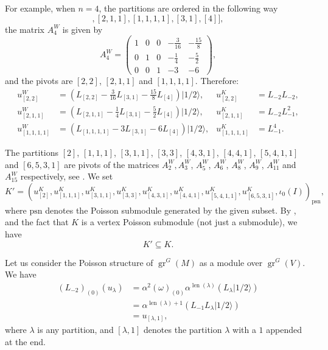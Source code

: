 \documentclass[a4paper, 12pt, reqno]{amsart}
\theoremstyle{remark}
\DeclareMathOperator{\gr}{gr}
\DeclareMathOperator{\len}{len}
\newcommand{\vachalf}{{|1/2\rangle}}
\newcommand{\psn}{{\mathrm{psn}}}
\begin{document}
For example, when $n = 4$, the partitions are ordered in the following way
\begin{equation*}
  [[2, 2], [2, 1, 1], [1, 1, 1, 1], [3, 1], [4]],
\end{equation*}
the matrix $A^W_4$ is given by
\begin{equation*}
  A^W_4=
  \begin{pmatrix}
    1 & 0 & 0 & -\frac{3}{16} & -\frac{15}{8} \\
    0 & 1 & 0 & -\frac{1}{4} & -\frac{5}{2} \\
    0 & 0 & 1 & -3 & -6
  \end{pmatrix},
\end{equation*}
and the pivots are $[2, 2]$, $[2, 1, 1]$ and $[1, 1, 1, 1]$.
Therefore:
\begin{align*}
  u^W_{[2, 2]} &= (L_{[2, 2]} - \tfrac{3}{16}L_{[3, 1]} - \tfrac{15}{8}L_{[4]})\vachalf, &u^K_{[2, 2]} &= L_{-2}L_{-2}, \\
  u^W_{[2, 1, 1]} &= (L_{[2, 1, 1]} - \tfrac{1}{4}L_{[3, 1]} - \tfrac{5}{2}L_{[4]})\vachalf, &u^K_{[2, 1, 1]} &= L_{-2}L_{-1}^2, \\
  u^W_{[1, 1, 1, 1]} &= (L_{[1, 1, 1, 1]} - 3L_{[3, 1]} - 6L_{[4]})\vachalf, &u^K_{[1, 1, 1, 1]} &= L_{-1}^4.
\end{align*}

The partitions $[2]$, $[1, 1, 1]$, $[3, 1, 1]$, $[3, 3]$, $[4, 3, 1]$, $[4, 4, 1]$, $[5, 4, 1, 1]$ and $[6, 5, 3, 1]$ are pivots of the matrices $A^W_2, A^W_3$, $A^W_5$, $A^W_6$, $A^W_8$, $A^W_9$, $A^W_{11}$ and $A^W_{15}$ respectively, see \cite[ising-modules.ipynb]{sagemath2}.
We set
\begin{equation*}
  K' = (u^K_{[2]}, u^K_{[1, 1, 1]}, u^K_{[3, 1, 1]}, u^K_{[3, 3]}, u^K_{[4, 3, 1]}, u^K_{[4, 4, 1]}, u^K_{[5, 4, 1, 1]}, u^K_{[6, 5, 3, 1]}, \iota_0(I))_{\psn},
\end{equation*}
where $\psn$ denotes the Poisson submodule generated by the given subset.
By ,  and the fact that $K$ is a vertex Poisson submodule (not just a submodule), we have
\begin{equation*}
  K' \subseteq K.
\end{equation*}

Let us consider the Poisson structure of $\gr^G(M)$ as a module over $\gr^G(V)$.
We have
\begin{align*}
  (L_{-2})_{(0)}(u_{\lambda}) &= \alpha^2(\omega)_{(0)}\alpha^{\len(\lambda)}(L_{\lambda}\vachalf) \\
                              &= \alpha^{\len(\lambda) + 1}(L_{-1}L_{\lambda}\vachalf) \\
                              &= u_{[\lambda, 1]},
\end{align*}
where $\lambda$ is any partition, and $[\lambda, 1]$ denotes the partition $\lambda$ with a $1$ appended at the end.
\end{document}

